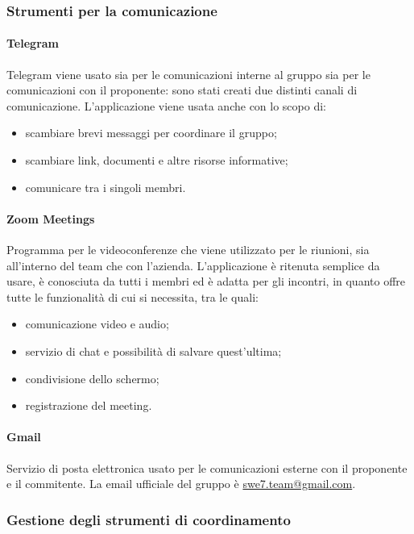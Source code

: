 \subsubsection{Strumenti per la comunicazione}
\paragraph{Telegram} \hfill \break
Telegram viene usato sia per le comunicazioni interne al gruppo sia per le comunicazioni con il proponente:
sono stati creati due distinti canali di comunicazione. L'applicazione viene usata anche con lo scopo di:
\begin{itemize}
    \item scambiare brevi messaggi per coordinare il gruppo;
    \item scambiare link, documenti e altre risorse informative;
    \item comunicare tra i singoli membri.
\end{itemize}

\paragraph{Zoom Meetings} \hfill \break
Programma per le videoconferenze che viene utilizzato per le riunioni, sia all'interno del team che con l'azienda. L'applicazione è ritenuta semplice da usare,
è conosciuta da tutti i membri ed è adatta per gli incontri, in quanto offre tutte le funzionalità di cui si necessita, tra le quali:
\begin{itemize}
    \item comunicazione video e audio;
    \item servizio di chat e possibilità di salvare quest'ultima;
    \item condivisione dello schermo;
    \item registrazione del meeting.
\end{itemize}

\paragraph{Gmail} \hfill \break
Servizio di posta elettronica usato per le comunicazioni esterne con il proponente e il commitente. La email ufficiale
del gruppo è \href{mailto:swe7.team@gmail.com}{swe7.team@gmail.com}.

\subsubsection{Gestione degli strumenti di coordinamento}
